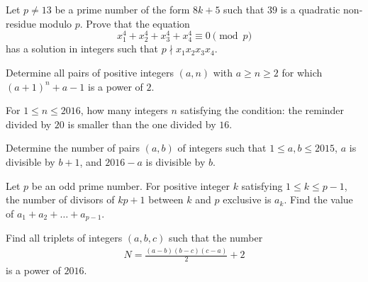 \begin{problem}
	Let $p \neq 13$ be a prime number of the form $8k+5$ such that $39$ is a quadratic non-residue modulo $p$. Prove that the equation $$x_1^4+x_2^4+x_3^4+x_4^4 \equiv 0 \pmod p$$ has a solution in integers such that $p\nmid x_1x_2x_3x_4$. %
\end{problem}

\begin{problem}
	Determine all pairs of positive integers $(a,n)$ with $a\ge n\ge 2$ for which $(a+1)^n+a-1$ is a power of $2$. %
\end{problem}

\begin{problem}
	For $1\leq n\leq 2016$, how many integers $n$ satisfying the condition: the reminder divided by $20$ is smaller than the one divided by $16$. %
\end{problem}

\begin{problem}
	Determine the number of pairs $(a, b)$ of integers such that $1 \leq a, b \leq 2015$, $a$ is divisible by $b + 1$, and $2016 - a$ is divisible by $b$.%
\end{problem}

\begin{problem}
	Let $p$ be an odd prime number. For positive integer $k$ satisfying $1\le k\le p-1$, the number of divisors of $kp+1$ between $k$ and $p$ exclusive is $a_k$. Find the value of $a_1+a_2+\ldots + a_{p-1}$. %
\end{problem}

\begin{problem}
	Find all triplets of integers $(a,b,c)$ such that the number
		\begin{align*}
			N = \frac{(a-b)(b-c)(c-a)}{2} + 2
		\end{align*}
	is a power of $2016$. %
\end{problem}

